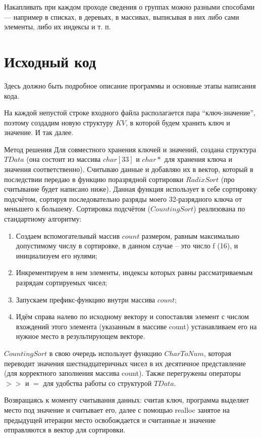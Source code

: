 Накапливать при каждом проходе сведения о группах можно разными способами — например в списках, в деревьях, в массивах, выписывая в них либо сами элементы, либо их индексы и т. п.

\pagebreak

\section{Исходный код}
Здесь должно быть подробное описание программы и основные этапы написания кода.

На каждой непустой строке входного файла располагается пара \enquote{ключ-значение}, поэтому создадим новую 
структуру $KV$, в которой будем хранить ключ и значение. И так далее.

Метод решения
Для совместного хранения ключей и значений, создана структура $TData$ (она состоит из массива $char[33]$ и $char*$ для хранения ключа и значения соответственно). Считываю данные и добавляю их в вектор, который в последствии передаю в функцию поразрядной сортировки $RadixSort$ (про считывание будет написано ниже). Данная функция использует в себе сортировку подсчётом, сортируя последовательно разряды моего 32-разрядного ключа от меньшего к большему. Сортировка подсчётом ($CountingSort$) реализована по стандартному алгоритму:
\begin{enumerate}
    \item Создаем вспомогательный массив $count$ размером, равным максимально допустимому числу в сортировке, в данном случае – это число f (16), и инициализуем его нулями;
    \item Инкрементируем в нем элементы, индексы которых равны рассматриваемым разрядам сортируемых чисел;
    \item Запускаем префикс-функцию внутри массива $count$;
    \item Идём справа налево по исходному вектору и сопоставляя элемент с числом вхождений этого элемента (указанным в массиве count) устанавливаем его на нужное место в результирующем векторе.
\end{enumerate}
$CountingSort$ в свою очередь использует функцию $CharToNum$, которая переводит значения шестнадцатеричных чисел в их десятичное представление (для корректного заполнения массива count).
Также перегружены операторы $>>$ и $=$ для удобства работы со структурой $TData$.

Возвращаясь к моменту считывания данных: считав ключ, программа выделяет место под значение и считывает его, далее с помощью realloc занятое на предыдущей итерации место освобождается и считанные и значение отправляются в вектор для сортировки.

